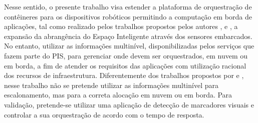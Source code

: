 Nesse sentido, o presente trabalho visa estender a plataforma de orquestração de contêineres para os dispositivos robóticos permitindo a computação em borda de aplicações, tal como realizado pelos trabalhos propostos pelos autores ,   e ,  a expansão da abrangência do Espaço Inteligente através dos sensores embarcados. No entanto,  utilizar as informações multinível, disponibilizadas pelos serviços que fazem parte do PIS, para gerenciar onde devem ser orquestrados, em nuvem ou em borda, a fim de atender os requisitos das aplicações com utilização racional dos recursos de infraestrutura. Diferentemente dos trabalhos propostos por  e , nesse trabalho não se pretende utilizar as informações multinível para escalonamento, mas para a correta alocação em nuvem ou em borda. Para validação, pretende-se utilizar uma aplicação de detecção de marcadores visuais e controlar a sua orquestração de acordo com o tempo de resposta.





